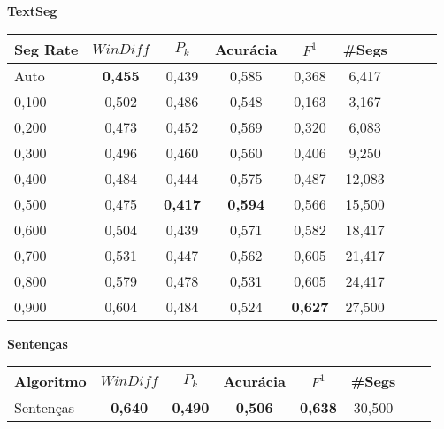 \documentclass{article}
\begin{document}


{  
\large
\center
	\textbf{TextSeg}  

}

 \begin{longtable}[c]{|l|c|c|c|c|c|c|c|c|} 
\hline 
Seg Rate & $WinDiff$ & $P_k$ & Acurácia & $F^1$ & \#Segs\\ \hline 
Auto & \cellcolor{gray!20} \textbf{0,455} & 0,439 & 0,585 & 0,368 & 6,417  \\ \hline 
0,100 & 0,502 & 0,486 & 0,548 & 0,163 & 3,167  \\ \hline 
0,200 & 0,473 & 0,452 & 0,569 & 0,320 & 6,083  \\ \hline 
0,300 & 0,496 & 0,460 & 0,560 & 0,406 & 9,250  \\ \hline 
0,400 & 0,484 & 0,444 & 0,575 & 0,487 & 12,083  \\ \hline 
0,500 & 0,475 & \cellcolor{gray!20} \textbf{0,417} & \cellcolor{gray!20} \textbf{0,594} & 0,566 & 15,500  \\ \hline 
0,600 & 0,504 & 0,439 & 0,571 & 0,582 & 18,417  \\ \hline 
0,700 & 0,531 & 0,447 & 0,562 & 0,605 & 21,417  \\ \hline 
0,800 & 0,579 & 0,478 & 0,531 & 0,605 & 24,417  \\ \hline 
0,900 & 0,604 & 0,484 & 0,524 & \cellcolor{gray!20} \textbf{0,627} & 27,500  \\ \hline 
 \end{longtable} 





{  
\large
\center
	\textbf{Sentenças}  

}

\begin{longtable}[c]{|l|c|c|c|c|c|c|c|} 
\hline 
Algoritmo & $WinDiff$ & $P_k$ & Acurácia & $F^1$ & \#Segs\\ \hline 
Sentenças & \cellcolor{gray!20} \textbf{0,640} & \cellcolor{gray!20} \textbf{0,490} & \cellcolor{gray!20} \textbf{0,506} & \cellcolor{gray!20} \textbf{0,638} & 30,500  \\ \hline 
 \end{longtable} 






\newpage
\end{document}
